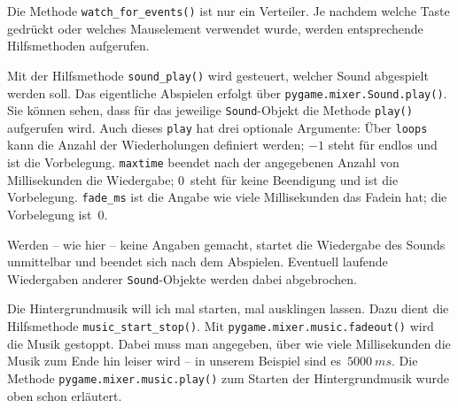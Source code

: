 
Die Methode \texttt{watch\_for\_events()} ist nur ein Verteiler. Je nachdem welche Taste gedrückt oder welches Mauselement verwendet wurde, werden entsprechende Hilfsmethoden aufgerufen.


Mit der Hilfsmethode \texttt{sound\_play()} wird gesteuert, welcher Sound abgespielt werden soll. Das eigentliche Abspielen erfolgt über \texttt{pygame.mixer.Sound.play()}. Sie können sehen, dass für das jeweilige \texttt{Sound}-Objekt die Methode \texttt{play()} aufgerufen wird. Auch dieses \texttt{play} hat drei optionale Argumente: Über \texttt{loops} kann die Anzahl der Wiederholungen definiert werden; $-1$ steht für endlos und ist die Vorbelegung. \texttt{maxtime} beendet nach der angegebenen Anzahl von Millisekunden die Wiedergabe; $0$~steht für keine Beendigung und ist die Vorbelegung. \texttt{fade\_ms} ist die Angabe wie viele Millisekunden das Fadein hat; die Vorbelegung ist~$0$.

Werden -- wie hier -- keine Angaben gemacht, startet die Wiedergabe des Sounds unmittelbar und beendet sich nach dem Abspielen. Eventuell laufende Wiedergaben anderer \texttt{Sound}-Objekte werden dabei abgebrochen.


Die Hintergrundmusik will ich mal starten, mal ausklingen lassen. Dazu dient die Hilfsmethode \texttt{music\_start\_stop()}. Mit  \texttt{pygame.mixer.music.fadeout()} wird die Musik gestoppt. Dabei muss man angegeben, über wie viele Millisekunden die Musik zum Ende hin leiser wird -- in unserem Beispiel sind es~$5000~ms$. Die Methode \texttt{pygame.mixer.music\-.play()} zum Starten der Hintergrundmusik wurde oben schon erläutert.



